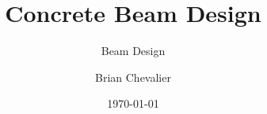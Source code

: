 \documentclass[landscape, twocolumn, 12pt]{article}
\begin{document}
	
\title{Concrete Beam Design}
\subtitle{Beam Design}
\subject{CEE421}
\author{Brian Chevalier}
\date{\today}
\maketitle
{}



\newpage


\end{document}
